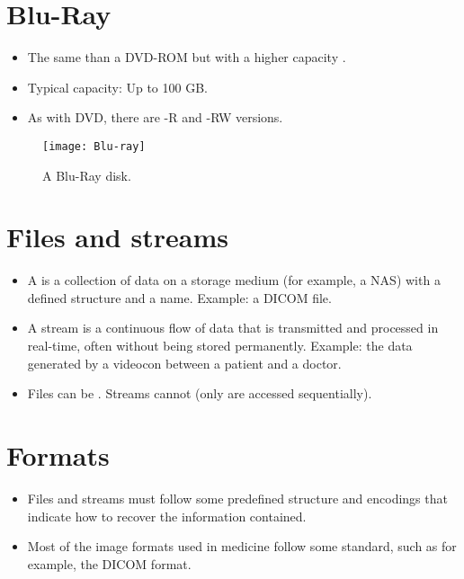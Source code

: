 \section{Blu-Ray}
\begin{itemize}
\item The same than a \gls{DVD-ROM} but with a higher capacity
  \cite{wikipedia_BR}.
\item Typical capacity: Up to 100 GB.
\item As with \gls{DVD}, there are -R and -RW versions.
\end{itemize}
\begin{figure}[H]
  \vspace{-16ex}
  \begin{flushright}
    \texttt{[image: Blu-ray]}
    \caption{A Blu-Ray disk.}
    \label{fig:Blu-Ray}
  \end{flushright}
\end{figure}

\section{Files and streams}
\begin{itemize}
\item A  is a collection of data  on a storage
medium (for example, a NAS) with a defined structure and a
name. Example: a DICOM file.
\item A stream is a continuous flow of data that is transmitted and
  processed in real-time, often without being stored
  permanently. Example: the data generated by a videocon between a
  patient and a doctor.
\item Files can be . Streams cannot (only are accessed
sequentially).
\end{itemize}

\section{Formats}
\begin{itemize}
\item Files and streams must follow some predefined structure and
encodings that indicate how to recover the information contained.
\item Most of the image formats used in medicine follow some standard,
  such as for example, the DICOM format.
\end{itemize}

